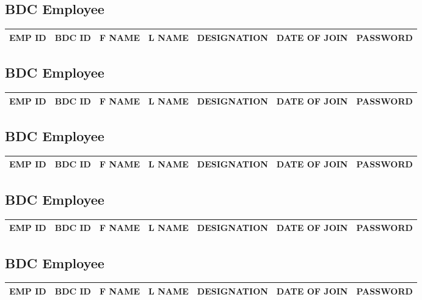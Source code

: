 \subsection{BDC Employee}

\begin{tabular}{ | c | c | c | c | c | c | c | }
 \hline
 EMP ID & BDC ID & F NAME & L NAME & DESIGNATION & DATE OF JOIN & PASSWORD \\
 \hline
\end{tabular}

\subsection{BDC Employee}

\begin{tabular}{ | c | c | c | c | c | c | c | }
 \hline
 EMP ID & BDC ID & F NAME & L NAME & DESIGNATION & DATE OF JOIN & PASSWORD \\
 \hline
\end{tabular}

\subsection{BDC Employee}

\begin{tabular}{ | c | c | c | c | c | c | c | }
 \hline
 EMP ID & BDC ID & F NAME & L NAME & DESIGNATION & DATE OF JOIN & PASSWORD \\
 \hline
\end{tabular}

\subsection{BDC Employee}

\begin{tabular}{ | c | c | c | c | c | c | c | }
 \hline
 EMP ID & BDC ID & F NAME & L NAME & DESIGNATION & DATE OF JOIN & PASSWORD \\
 \hline
\end{tabular}

\subsection{BDC Employee}

\begin{tabular}{ | c | c | c | c | c | c | c | }
 \hline
 EMP ID & BDC ID & F NAME & L NAME & DESIGNATION & DATE OF JOIN & PASSWORD \\
 \hline
\end{tabular}

